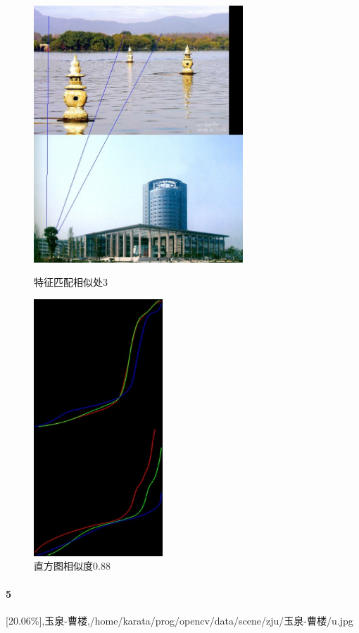 \begin{figure}[htb]
\begin{minipage}[t]{0.5\linewidth}
\centering
\includegraphics[height=3.8in]{三映.jpg.d/im4sift.jpg}
\caption{特征匹配相似处3}
\label{fig:side:a}
\end{minipage}%
\begin{minipage}[t]{0.5\linewidth}
\centering
\includegraphics[height=3.8in]{三映.jpg.d/im4hist2.jpg}
\caption{直方图相似度0.88}
\label{fig:side:a}
\end{minipage}%
\end{figure}

\paragraph{5}
[20.06\%],玉泉-曹楼,/home/karata/prog/opencv/data/scene/zju/玉泉-曹楼/u.jpg

